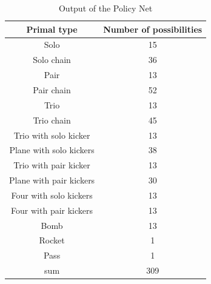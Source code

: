 \documentclass{article}
\begin{document}
  
\begin{table}[!ht]
    \caption{Output of the Policy Net}\label{OutPolicy}
    \centering
    \begin{threeparttable}          
      \begin{tabular}{cc}\toprule
        
Primal type             & Number of possibilities \\ \hline
Solo                    & 15                      \\
Solo chain              & 36                      \\
Pair                    & 13                      \\
Pair chain              & 52                      \\
Trio                    & 13                      \\
Trio chain              & 45                      \\
Trio with solo kicker   & 13                      \\
Plane with solo kickers & 38                      \\
Trio with pair kicker   & 13                      \\
Plane with pair kickers & 30                      \\
Four with solo kickers  & 13                      \\
Four with pair kickers  & 13                      \\
Bomb                    & 13                      \\
Rocket                  & 1                       \\
Pass                    & 1                       \\ \hline
sum                     & 309                     \\ \hline
      \end{tabular}
    \end{threeparttable}  
  \end{table}
\end{document}
